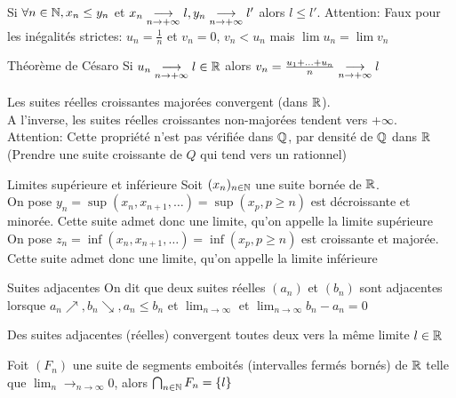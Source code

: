 \documentclass[]{report}
\begin{document}
\begin{re}{}{}
    Si $\forall n\in \mathbb{N}, x_n \le y_n$ et $x_n\underset{n\to +\infty}{\longrightarrow} l , y_n \underset{n\to +\infty}{\longrightarrow} l'$ alors $l\le l'$.
    Attention: Faux pour les inégalités strictes: $u_n = \frac{1}{n}$ et $v_n=0$, $v_n <u_n$ mais $\lim u_n= \lim v_n$
\end{re}

\begin{tm}{Théorème de Césaro}{}
    Si $u_n \underset{n\to +\infty}{\longrightarrow} l \in \mathbb{R}$ alors $v_n=\frac{u_1+\ldots +u_n}{n}\underset{n\to +\infty}{\longrightarrow} l$
\end{tm}

\begin{prop}{}{}
    Les suites réelles croissantes majorées convergent (dans $\mathbb{R}$).\\
    A l'inverse, les suites réelles croissantes non-majorées tendent vers +$\infty$.\\
    Attention: Cette propriété n'est pas vérifiée dans $\mathbb{Q}$, par densité de $\mathbb{Q}$ dans $\mathbb{R}$ (Prendre une suite croissante de $Q$ qui tend vers un rationnel)
\end{prop}

\begin{dfprop}{Limites supérieure et inférieure}{}
    Soit $(x_n)_{n\in\mathbb{N}}$ une suite bornée de $\mathbb{R}$. \\
    On pose $y_n=\sup \left( x_n, x_{n+1} ,\ldots\right)= \sup \left( x_p,p\ge n\right)$ est décroissante et minorée. Cette suite admet donc une limite, qu'on appelle la limite supérieure\\
    On pose $z_n=\inf \left( x_n, x_{n+1} ,\ldots\right)= \inf \left( x_p,p\ge n\right)$ est croissante et majorée. Cette suite admet donc une limite, qu'on appelle la limite inférieure
\end{dfprop}

\begin{df}{Suites adjacentes}{}
    On dit que deux suites réelles $(a_n)$ et $(b_n)$ sont adjacentes lorsque $a_n \nearrow, b_n \searrow, a_n \le b_n$ et $\lim_{n\to \infty}$ et $\lim_{n\to \infty} b_n-a_n=0$
\end{df}

\begin{prop}{}{}
    Des suites adjacentes (réelles) convergent toutes deux vers la même limite $l\in \mathbb{R}$
\end{prop}

\begin{prop}{}{}
    Foit $(F_n)$ une suite de segments emboités (intervalles fermés bornés) de $\mathbb{R}$ telle que $\lim_n \longrightarrow_{n\to \infty} 0$, alors $\bigcap_{n\in\mathbb{N}} F_n = \{ l\}$
\end{prop}
\end{document}
